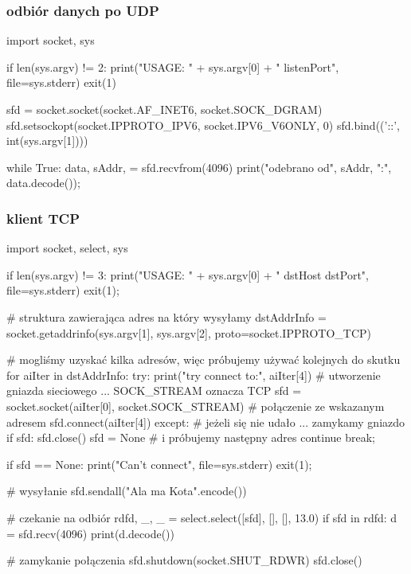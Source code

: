 \documentclass{pdfBooklets}
\begin{document}
\subsubsection{odbiór danych po UDP}
\begin{CodeFrame*}[python]{}
import socket, sys

if len(sys.argv) != 2:
  print("USAGE: " + sys.argv[0] + " listenPort", file=sys.stderr)
  exit(1)

sfd = socket.socket(socket.AF_INET6, socket.SOCK_DGRAM)
sfd.setsockopt(socket.IPPROTO_IPV6, socket.IPV6_V6ONLY, 0)
sfd.bind(('::', int(sys.argv[1])))

while True:
  data, sAddr, = sfd.recvfrom(4096)
  print("odebrano od", sAddr, ":", data.decode());
\end{CodeFrame*}

\subsubsection{klient TCP}
\begin{CodeFrame*}[python]{}
import socket, select, sys

if len(sys.argv) != 3:
	print("USAGE: " + sys.argv[0] + " dstHost dstPort", file=sys.stderr)
	exit(1);

# struktura zawierająca adres na który wysyłamy
dstAddrInfo = socket.getaddrinfo(sys.argv[1], sys.argv[2], proto=socket.IPPROTO_TCP)

# mogliśmy uzyskać kilka adresów, więc próbujemy używać kolejnych do skutku
for aiIter in dstAddrInfo:
	try:
		print("try connect to:", aiIter[4])
		# utworzenie gniazda sieciowego ... SOCK_STREAM oznacza TCP
		sfd = socket.socket(aiIter[0], socket.SOCK_STREAM)
		# połączenie ze wskazanym adresem
		sfd.connect(aiIter[4])
	except:
		# jeżeli się nie udało ... zamykamy gniazdo
		if sfd:
			sfd.close()
		sfd = None
		# i próbujemy następny adres
		continue
	break;

if sfd == None:
	print("Can't connect", file=sys.stderr)
	exit(1);

# wysyłanie
sfd.sendall("Ala ma Kota\n".encode())

# czekanie na odbiór
rdfd, _, _ = select.select([sfd], [], [], 13.0)
if sfd in rdfd:
	d = sfd.recv(4096)
	print(d.decode())

# zamykanie połączenia
sfd.shutdown(socket.SHUT_RDWR)
sfd.close()
\end{CodeFrame*}
\end{document}
